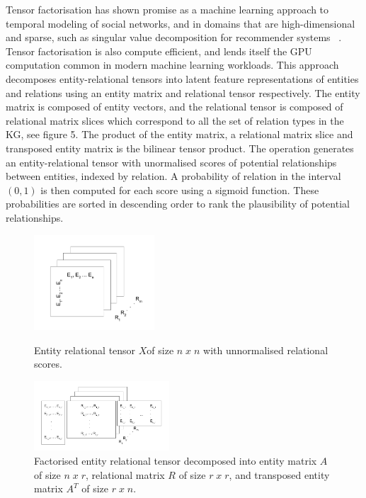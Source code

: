 \noindent Tensor factorisation has shown promise as a machine learning approach to temporal modeling of social networks, and in domains that are high-dimensional and sparse, such as singular value decomposition for recommender systems \unskip ~\citep{koren2009matrix}. Tensor factorisation is also compute efficient, and lends itself the GPU computation common in modern machine learning workloads. This approach decomposes entity-relational tensors into latent feature representations of entities and relations using an entity matrix and relational tensor respectively. The entity matrix is composed of entity vectors, and the relational tensor is composed of relational matrix slices which correspond to all the set of relation types in the KG, see figure 5. The product of the entity matrix, a relational matrix slice and transposed entity matrix is the bilinear tensor product. The operation generates an entity-relational tensor with unormalised scores of potential relationships between entities, indexed by relation. A probability of relation in the interval $ (0, 1) $ is then computed for each score using a sigmoid function. These probabilities are sorted in descending order to rank the plausibility of potential relationships. 

\begin{figure}[H]
	\parbox{.45\linewidth}{
   		\centering
    		\includegraphics[width=0.4\textwidth, height=0.4\textwidth]{entity_relational_tensor.png}
		\caption{Entity relational tensor $ X $of size $ n \; x \; n $ with unnormalised relational scores.}
	}
	\hfill
	\parbox{.45\linewidth}{
   		\centering
    		\includegraphics[width=0.45\textwidth, height=0.4\textwidth]{factorised_entity_relational_tensor_ARAt.png}
		\caption{Factorised entity relational tensor decomposed into entity matrix $ A $ of size $ n \; x \; r $, relational matrix $ R $ of size $ r \; x \; r $, and transposed entity matrix $ A^T $ of size $ r \; x \; n $.}
	}
\end{figure}

